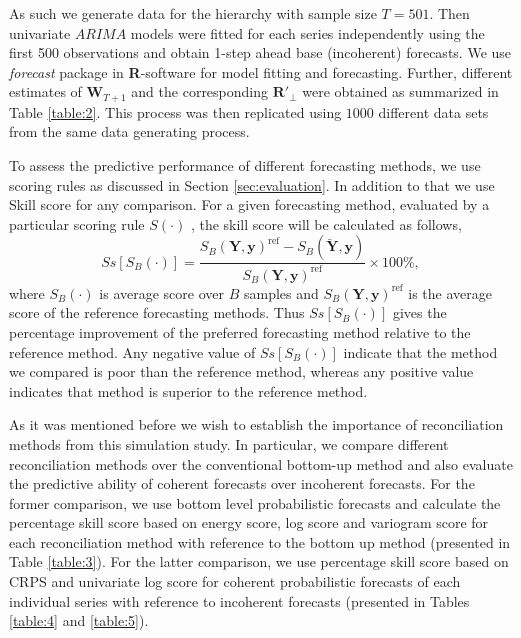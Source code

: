 \documentclass[a4paper, 11pt]{article}
\begin{document}
As such we generate data for the hierarchy with sample size $T=501$. Then univariate $ARIMA$ models were fitted for each series independently using the first 500 observations and obtain 1-step ahead base (incoherent) forecasts. We use \textit{forecast} package in \textbf{R}-software \citet{hyndman2017forecasting} for model fitting and forecasting. Further, different estimates of $\bm{W}_{T+1}$ and the corresponding $\bm{R}'_\bot$ were obtained as summarized in Table \ref{table:2}. This process was then replicated using $1000$ different data sets from the same data generating process.

To assess the predictive performance of different forecasting methods, we use scoring rules as discussed in Section \ref{sec:evaluation}. In addition to that we use Skill score \citep{Gneiting2007} for any comparison. For a given forecasting method, evaluated by a particular scoring rule $S(\cdot)$ , the skill score will be calculated as follows,
\begin{equation}
Ss[S_B(\cdot)] = \frac{S_B(\bm{Y},\bm{y})^{\text{ref}} - S_B(\breve{\bm{Y}},\bm{y})}{S_B(\bm{Y},\bm{y})^{\text{ref}}}\times 100\%,
\end{equation}
where $S_B(\cdot)$ is average score over $B$ samples and $S_B(\bm{Y},\bm{y})^{\text{ref}}$ is the average score of the reference forecasting methods. Thus $Ss[S_B(\cdot)]$ gives the percentage improvement of the preferred forecasting method relative to the reference method. Any negative value of $Ss[S_B(\cdot)]$ indicate that the method we compared is poor than the reference method, whereas any positive value indicates that method is superior to the reference method.

As it was mentioned before we wish to establish the importance of reconciliation methods from this simulation study. In particular, we compare different reconciliation methods over the conventional bottom-up method and also evaluate the predictive ability of coherent forecasts over incoherent forecasts. For the former comparison, we use bottom level probabilistic forecasts and calculate the percentage skill score based on energy score, log score and variogram score for each reconciliation method with reference to the bottom up method (presented in Table \ref{table:3}). For the latter comparison, we use percentage skill score based on CRPS and univariate log score for coherent probabilistic forecasts of each individual series with reference to incoherent forecasts (presented in Tables \ref{table:4} and \ref{table:5}).
\end{document}
